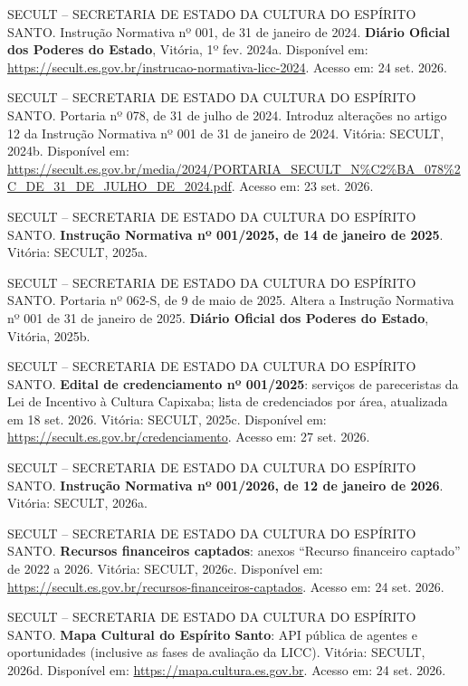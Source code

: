 \documentclass[12pt,a4paper]{article}
\newenvironment{referencias}{\raggedright\setlength{\parindent}{0pt}\setlength{\parskip}{0.5\baselineskip}}{\par}
\begin{document}
\begin{referencias}
\protect{}\label{ref-secult-33}{}SECULT -- SECRETARIA DE ESTADO DA CULTURA DO ESPÍRITO
SANTO. Instrução Normativa nº 001, de 31 de janeiro de 2024. \textbf{Diário Oficial dos Poderes do
Estado}, Vitória, 1º fev. 2024a. Disponível em:
\url{https://secult.es.gov.br/instrucao-normativa-licc-2024}. Acesso em: 24 set. 2026.

\protect{}\label{ref-secult-34}{}SECULT -- SECRETARIA DE ESTADO DA CULTURA DO ESPÍRITO
SANTO. Portaria nº 078, de 31 de julho de 2024. Introduz alterações no artigo 12 da Instrução
Normativa nº 001 de 31 de janeiro de 2024. Vitória: SECULT, 2024b. Disponível em:
\url{https://secult.es.gov.br/media/2024/PORTARIA_SECULT_N\%C2\%BA_078\%2C_DE_31_DE_JULHO_DE_2024.pdf}.
Acesso em: 23 set. 2026.

\protect{}\label{ref-secult-35}{}SECULT -- SECRETARIA DE ESTADO DA CULTURA DO ESPÍRITO
SANTO. \textbf{Instrução Normativa nº 001/2025, de 14 de janeiro de 2025}. Vitória: SECULT, 2025a.

\protect{}\label{ref-secult-36}{}SECULT -- SECRETARIA DE ESTADO DA CULTURA DO ESPÍRITO
SANTO. Portaria nº 062-S, de 9 de maio de 2025. Altera a Instrução Normativa nº 001 de 31 de janeiro
de 2025. \textbf{Diário Oficial dos Poderes do Estado}, Vitória, 2025b.

\protect{}\label{ref-secult-37}{}SECULT -- SECRETARIA DE ESTADO DA CULTURA DO ESPÍRITO
SANTO. \textbf{Edital de credenciamento nº 001/2025}: serviços de pareceristas da Lei de Incentivo à
Cultura Capixaba; lista de credenciados por área, atualizada em 18 set. 2026. Vitória: SECULT,
2025c. Disponível em: \url{https://secult.es.gov.br/credenciamento}. Acesso em: 27 set. 2026.

\protect{}\label{ref-secult-38}{}SECULT -- SECRETARIA DE ESTADO DA CULTURA DO ESPÍRITO
SANTO. \textbf{Instrução Normativa nº 001/2026, de 12 de janeiro de 2026}. Vitória: SECULT, 2026a.

\protect{}\label{ref-secult-39}{}SECULT -- SECRETARIA DE ESTADO DA CULTURA DO ESPÍRITO
SANTO. \textbf{Recursos financeiros captados}: anexos ``Recurso financeiro captado'' de 2022 a 2026.
Vitória: SECULT, 2026c. Disponível em: \url{https://secult.es.gov.br/recursos-financeiros-captados}.
Acesso em: 24 set. 2026.

\protect{}\label{ref-secult-40}{}SECULT -- SECRETARIA DE ESTADO DA CULTURA DO ESPÍRITO
SANTO. \textbf{Mapa Cultural do Espírito Santo}: API pública de agentes e oportunidades (inclusive
as fases de avaliação da LICC). Vitória: SECULT, 2026d. Disponível em:
\url{https://mapa.cultura.es.gov.br}. Acesso em: 24 set. 2026.


\end{referencias}
\end{document}
